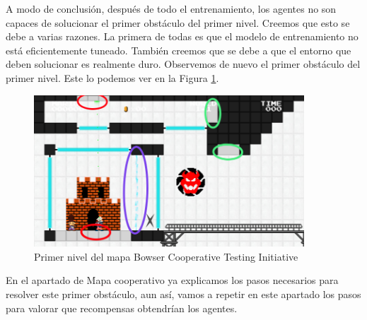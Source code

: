 A modo de conclusión, después de todo el entrenamiento, los agentes no son capaces de solucionar el primer obstáculo del primer nivel. Creemos que esto se debe a varias razones. La primera de todas es que el modelo de entrenamiento no está eficientemente tuneado. También creemos que se debe a que el entorno que deben solucionar es realmente duro. Observemos de nuevo el primer obstáculo del primer nivel. Este lo podemos ver en la Figura \ref{fig:mapa-duro}.
\begin{figure}[ht]
    \centering
    \includegraphics[width=0.9\textwidth]{img/mario-1-level.png}
    \caption{Primer nivel del mapa Bowser Cooperative Testing Initiative \cite {mari0-mapa}}
    \label{fig:mapa-duro}
\end{figure}

En el apartado de Mapa cooperativo ya explicamos los pasos necesarios para resolver este primer obstáculo, aun así, vamos a repetir en este apartado los pasos para valorar que recompensas obtendrían los agentes.

